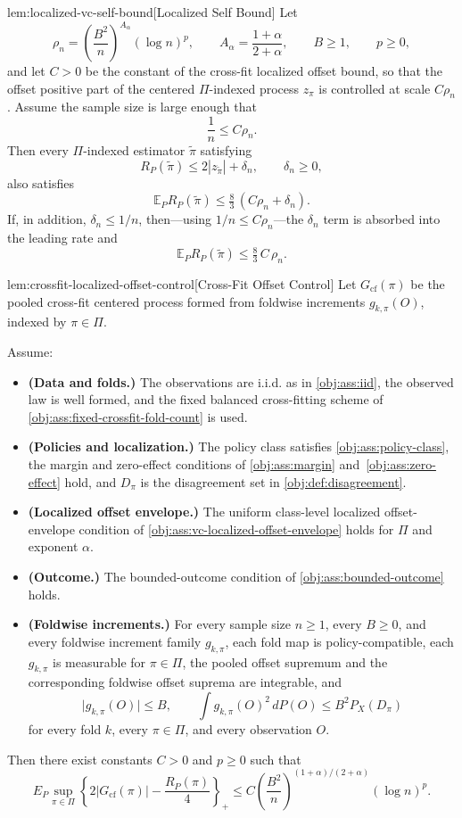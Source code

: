 \begin{lemmav}{lem:localized-vc-self-bound}[Localized Self Bound]
Let
\[
\rho_n=\left(\frac{B^2}{n}\right)^{A_\alpha}(\log n)^p,
\qquad A_\alpha=\frac{1+\alpha}{2+\alpha},
\qquad B\ge 1,
\qquad p\ge 0,
\]
and let \(C>0\) be the constant of the cross-fit localized offset bound, so that the offset positive part of the centered \(\Pi\)-indexed process \(z_\pi\) is controlled at scale \(C\rho_n\). Assume the sample size is large enough that
\[
\frac1n\le C\rho_n .
\]
Then every \(\Pi\)-indexed estimator \(\widetilde\pi\) satisfying
\[
R_P(\widetilde\pi)\le 2|z_{\widetilde\pi}|+\delta_n,
\qquad \delta_n\ge 0,
\]
also satisfies
\[
\mathbb E_P R_P(\widetilde\pi)\le \tfrac{8}{3}\,(C\rho_n+\delta_n).
\]
If, in addition, \(\delta_n\le 1/n\), then---using \(1/n\le C\rho_n\)---the \(\delta_n\) term is absorbed into the leading rate and
\[
\mathbb E_P R_P(\widetilde\pi)\le \tfrac{8}{3}\,C\,\rho_n .
\]
\end{lemmav}

\begin{lemmav}{lem:crossfit-localized-offset-control}[Cross-Fit Offset Control]
Let \(G_{\mathrm{cf}}(\pi)\) be the pooled cross-fit centered process formed from foldwise increments \(g_{k,\pi}(O)\), indexed by \(\pi\in\Pi\).

Assume:
\begin{itemize}
\item \textbf{(Data and folds.)} The observations are i.i.d. as in \cref{obj:ass:iid}, the observed law is well formed, and the fixed balanced cross-fitting scheme of \cref{obj:ass:fixed-crossfit-fold-count} is used.
\item \textbf{(Policies and localization.)} The policy class satisfies \cref{obj:ass:policy-class}, the margin and zero-effect conditions of \cref{obj:ass:margin} and~\cref{obj:ass:zero-effect} hold, and \(D_\pi\) is the disagreement set in \cref{obj:def:disagreement}.
\item \textbf{(Localized offset envelope.)} The uniform class-level localized offset-envelope condition of \cref{obj:ass:vc-localized-offset-envelope} holds for \(\Pi\) and exponent \(\alpha\).
\item \textbf{(Outcome.)} The bounded-outcome condition of \cref{obj:ass:bounded-outcome} holds.
\item \textbf{(Foldwise increments.)} For every sample size \(n\ge1\), every \(B\ge0\), and every foldwise increment family \(g_{k,\pi}\), each fold map is policy-compatible, each \(g_{k,\pi}\) is measurable for \(\pi\in\Pi\), the pooled offset supremum and the corresponding foldwise offset suprema are integrable, and
\[
\lvert g_{k,\pi}(O)\rvert\le B,
\qquad
\int g_{k,\pi}(O)^2\,dP(O)
\le B^2 P_X(D_\pi)
\]
for every fold \(k\), every \(\pi\in\Pi\), and every observation \(O\).
\end{itemize}
Then there exist constants \(C>0\) and \(p\ge0\) such that
\[
E_P \sup_{\pi\in\Pi}
\left\{2\lvert G_{\mathrm{cf}}(\pi)\rvert-\frac{R_P(\pi)}{4}\right\}_{+}
\le
C\left(\frac{B^2}{n}\right)^{(1+\alpha)/(2+\alpha)}(\log n)^p .
\]
\end{lemmav}

